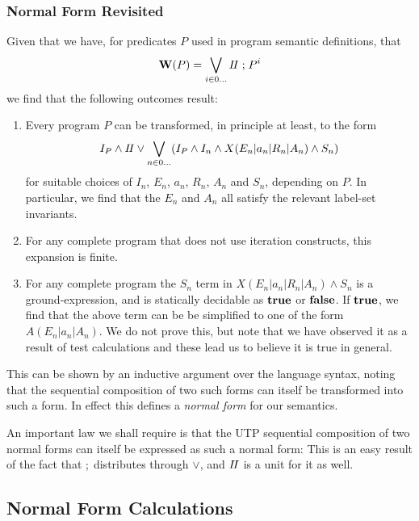 \subsubsection{Normal Form Revisited}
Given that we have,
for predicates $P$ used in program semantic definitions,
that
\[
  \mathbf{W}(P) = \bigvee_{i \in 0\dots} I\!I \mathrel{;} P^i
\]
we find that the following outcomes result:
\begin{enumerate}
  \item
    Every program $P$ can be transformed,
    in principle at least,
    to the form
    \[
      I_P \land I\!I
      \lor
      \bigvee_{n \in 0\dots}  (I_P \land I_n \land X(E_n|a_n|R_n|A_n) \land S_n)
    \]
    for suitable choices of $I_n$, $E_n$, $a_n$, $R_n$, $A_n$ and $S_n$,
    depending on $P$.
    In particular, we find that the $E_n$ and $A_n$ all satisfy the relevant
    label-set invariants.
  \item
    For any complete program that does not use iteration constructs,
    this expansion is finite.
  \item
    For any complete program the $S_n$
    term in $X(E_n|a_n|R_n|A_n) \land S_n$
    is a ground-expression, and is statically decidable as $\mathbf{true}$ or $\mathbf{false}$.
    If $\mathbf{true}$, we find that the above term
    can be be simplified to one of the form $A(E_n|a_n|A_n)$.
    We do not prove this, but note that we have observed it as a result
    of test calculations and these lead us to believe it is true in general.
\end{enumerate}
This can be shown by an inductive argument over the language syntax,
noting that the sequential composition of two such forms
can itself be transformed into such a form.
In effect this defines a \emph{normal form} for our semantics.


An important law we shall require is that the UTP sequential
composition of two normal forms can itself be expressed
as such a normal form:
This is an easy result of the fact that $\mathrel{;}$ distributes through $\lor$,
and $I\!I$ is a unit for it as well.

\subsection{Normal Form Calculations}\label{ssec:nf-calc}

